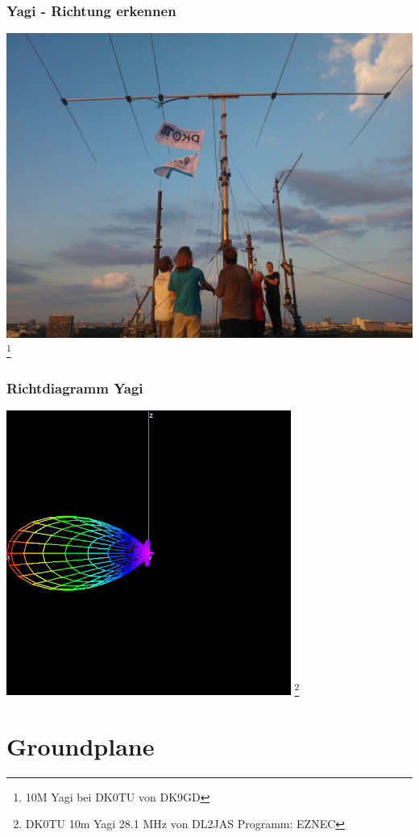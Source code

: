 \begin{frame}
    \frametitle{Yagi - Richtung erkennen}
    \begin{center}
        \includegraphics[width=.9\textwidth]{e11/yagi.jpg}
        \footnote{\tiny 10M Yagi bei DK0TU von DK9GD}
	\end{center}
\end{frame}

\begin{frame}
    \frametitle{Richtdiagramm Yagi}
    \begin{center}
        \includegraphics[width=0.7\textwidth]{e11/yagi_gain.png}
        \footnote{\tiny DK0TU 10m Yagi 28.1 MHz von DL2JAS Programm: EZNEC}
	\end{center}
\end{frame}

\section*{Groundplane}

